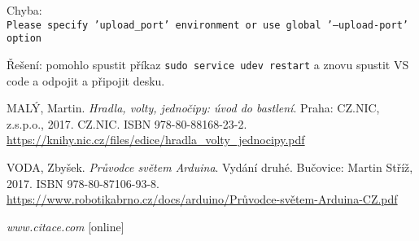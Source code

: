  Chyba: \\
 {\tt  Please specify 'upload\_port' environment or use global '--upload-port' option}
 
 Řešení: pomohlo spustit příkaz {\tt sudo service udev restart} a znovu spustit VS code a odpojit a připojit desku.  


\begin{thebibliography}{9} \label{literatura}
	
	 MALÝ, Martin. \textit{Hradla, volty, jednočipy: úvod do bastlení}. Praha: CZ.NIC, z.s.p.o., 2017. CZ.NIC. ISBN 978-80-88168-23-2. \\
	\url{https://knihy.nic.cz/files/edice/hradla_volty_jednocipy.pdf}
	
	 VODA, Zbyšek. \textit{Průvodce světem Arduina}. Vydání druhé. Bučovice: Martin Stříž, 2017. ISBN 978-80-87106-93-8. \\
	\url{https://www.robotikabrno.cz/docs/arduino/Průvodce-světem-Arduina-CZ.pdf}

	 \textit{www.citace.com}  [online]
	
\end{thebibliography} %



